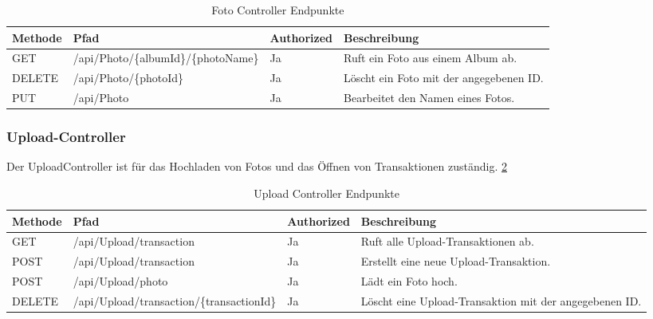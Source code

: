 \begin{table}[h t]
    \centering
    \caption{Foto Controller Endpunkte}
    \label{tab:foto-controller}
    \begin{tabular}{|l|p{5cm}|l|p{5cm}|}
    \hline
    \textbf{Methode} & \textbf{Pfad} & \textbf{Authorized} & \textbf{Beschreibung} \\ \hline
    GET & /api/Photo/\{albumId\}\break/\{photoName\} & Ja & Ruft ein Foto aus einem Album ab. \\ \hline
    DELETE & /api/Photo/\{photoId\} & Ja & Löscht ein Foto mit der angegebenen ID. \\ \hline
    PUT & /api/Photo & Ja & Bearbeitet den Namen eines Fotos. \\ \hline
    \end{tabular}
\end{table}


\subsubsection{Upload-Controller}

Der UploadController ist für das Hochladen von Fotos und das Öffnen von 
Transaktionen zuständig. \ref{tab:upload-controller}

\begin{table}[h t]
    \centering
    \caption{Upload Controller Endpunkte}
    \label{tab:upload-controller}
    \begin{tabular}{|l|p{5cm}|l|p{5cm}|}
    \hline
    \textbf{Methode} & \textbf{Pfad} & \textbf{Authorized} & \textbf{Beschreibung} \\ \hline
    GET & /api/Upload/transaction & Ja & Ruft alle Upload-Transaktionen ab. \\ \hline
    POST & /api/Upload/transaction & Ja & Erstellt eine neue Upload-Transaktion. \\ \hline
    POST & /api/Upload/photo & Ja & Lädt ein Foto hoch. \\ \hline
    DELETE & /api/Upload/transaction\break/\{transactionId\} & Ja & Löscht eine Upload-Transaktion mit der angegebenen ID. \\ \hline
    \end{tabular}
\end{table}



